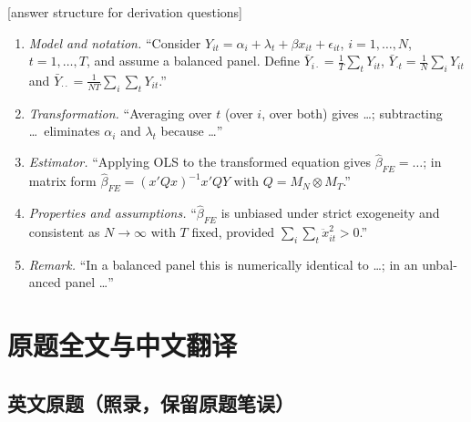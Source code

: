 \begin{english}[answer structure for derivation questions]
\begin{enumerate}
  \item \emph{Model and notation.} ``Consider $Y_{it}=\alpha_i+\lambda_t+\beta x_{it}+\epsilon_{it}$, $i=1,\dots,N$, $t=1,\dots,T$, and assume a balanced panel. Define $\bar Y_{i\cdot}=\frac1T\sum_tY_{it}$, $\bar Y_{\cdot t}=\frac1N\sum_iY_{it}$ and $\bar Y_{\cdot\cdot}=\frac1{NT}\sum_i\sum_tY_{it}$.''
  \item \emph{Transformation.} ``Averaging over $t$ (over $i$, over both) gives \dots; subtracting \dots\ eliminates $\alpha_i$ and $\lambda_t$ because \dots''
  \item \emph{Estimator.} ``Applying OLS to the transformed equation gives $\hat\beta_{FE}=\dots$; in matrix form $\hat\beta_{FE}=(x'Qx)^{-1}x'QY$ with $Q=M_N\otimes M_T$.''
  \item \emph{Properties and assumptions.} ``$\hat\beta_{FE}$ is unbiased under strict exogeneity and consistent as $N\to\infty$ with $T$ fixed, provided $\sum_i\sum_t\ddot x_{it}^2>0$.''
  \item \emph{Remark.} ``In a balanced panel this is numerically identical to \dots; in an unbalanced panel \dots''
\end{enumerate}
\end{english}

\section{原题全文与中文翻译}\label{sec:U17a-text}

\subsection{英文原题（照录，保留原题笔误）}

